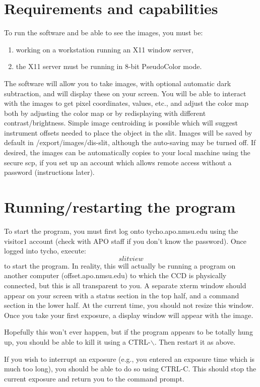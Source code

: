 \documentclass[10pt]{article}
\renewcommand{\[}{\begin{eqnarray}}
\renewcommand{\]}{\end{eqnarray}}
\begin{document}
\section{Requirements and capabilities}

To run the software and be able to see the images, you must be:
\begin{enumerate}
  \item working on a workstation running an X11 window server,
  \item the X11 server must be running in 8-bit PseudoColor mode.
\end{enumerate}

The software will allow you to take images, with optional automatic dark
subtraction, and will display these on your screen. You will be able to
interact with the images to get pixel coordinates, values, etc., and 
adjust the color map both by adjusting the color map or by redisplaying
with different contrast/brightness. Simple image centroiding is possible
which will suggest instrument offsets needed to place the object in
the slit.  Images will be saved by default in /export/images/dis-slit,
although the auto-saving may be turned off.  If desired, the images
can be automatically copies to your local machine using the secure scp,
if you set up an account which allows remote access without a password
(instructions later).

\section{Running/restarting the program}

To start the program, you must first log onto tycho.apo.nmsu.edu using
the visitor1 account (check with APO staff if you don't know the password).
Once logged into tycho, execute:
$$slitview$$
to start the program. In reality, this will actually be running a program
on another computer (offset.apo.nmsu.edu) to which the CCD is physically
connected, but this is all transparent to you. A separate xterm window
should appear on your screen with a status section in the top half, and
a command section in the lower half. At the current time, you should not
resize this window. Once you take your first exposure, a display window
will appear with the image.

Hopefully this won't ever happen, but if the program appears to be totally 
hung up, you should be able to kill it using a CTRL-$\backslash$. Then 
restart it as above.

If you wish to interrupt an exposure (e.g., you entered an exposure time
which is much too long), you should be able to do so using CTRL-C. This
should stop the current exposure and return you to the command prompt.
\end{document}
